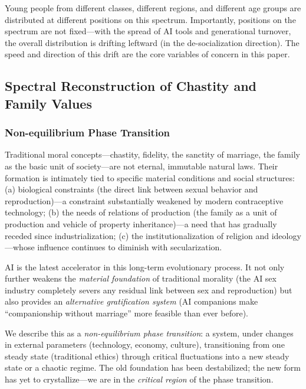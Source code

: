 ﻿\documentclass[12pt,a4paper]{article}
\begin{document}
Young people from different classes, different regions, and different age groups are distributed at different positions on this spectrum. Importantly, positions on the spectrum are not fixed---with the spread of AI tools and generational turnover, the overall distribution is drifting leftward (in the de-socialization direction). The speed and direction of this drift are the core variables of concern in this paper.

\subsection{Spectral Reconstruction of Chastity and Family Values}

\subsubsection{Non-equilibrium Phase Transition}

Traditional moral concepts---chastity, fidelity, the sanctity of marriage, the family as the basic unit of society---are not eternal, immutable natural laws. Their formation is intimately tied to specific material conditions and social structures: (a) biological constraints (the direct link between sexual behavior and reproduction)---a constraint substantially weakened by modern contraceptive technology; (b) the needs of relations of production (the family as a unit of production and vehicle of property inheritance)---a need that has gradually receded since industrialization; (c) the institutionalization of religion and ideology---whose influence continues to diminish with secularization.

AI is the latest accelerator in this long-term evolutionary process. It not only further weakens the \emph{material foundation} of traditional morality (the AI sex industry completely severs any residual link between sex and reproduction) but also provides an \emph{alternative gratification system} (AI companions make ``companionship without marriage'' more feasible than ever before).

We describe this as a \emph{non-equilibrium phase transition}: a system, under changes in external parameters (technology, economy, culture), transitioning from one steady state (traditional ethics) through critical fluctuations into a new steady state or a chaotic regime. The old foundation has been destabilized; the new form has yet to crystallize---we are in the \emph{critical region} of the phase transition.
\end{document}
